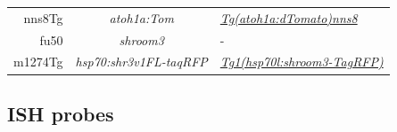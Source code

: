 \documentclass[11pt,singlespacinge,twoside]{reedthesis} %
\theoremstyle{definition}
\theoremstyle{definition}
\theoremstyle{definition}
\theoremstyle{remark}
\begin{document}
\begin{longtable}[]{@{}rcl@{}}
\begin{minipage}[t]{0.12\columnwidth}
nns8Tg\strut
\end{minipage} & \begin{minipage}[t]{0.29\columnwidth}\centering
\emph{atoh1a:Tom}\strut
\end{minipage} & \begin{minipage}[t]{0.50\columnwidth}\raggedright
\href{//zfin.org/ZDB-FISH-150901-21622}{\emph{Tg(atoh1a:dTomato)nns8}}\strut
\end{minipage}\tabularnewline
\begin{minipage}[t]{0.12\columnwidth}\raggedleft
fu50\strut
\end{minipage} & \begin{minipage}[t]{0.29\columnwidth}\centering
\emph{shroom3}\strut
\end{minipage} & \begin{minipage}[t]{0.50\columnwidth}\raggedright
-\strut
\end{minipage}\tabularnewline
\begin{minipage}[t]{0.12\columnwidth}\raggedleft
m1274Tg\strut
\end{minipage} & \begin{minipage}[t]{0.29\columnwidth}\centering
\emph{hsp70:shr3v1FL-taqRFP}\strut
\end{minipage} & \begin{minipage}[t]{0.50\columnwidth}\raggedright
\href{//zfin.org/ZDB-FISH-150901-25907}{\emph{Tg1(hsp70l:shroom3-TagRFP)}}\strut
\end{minipage}\tabularnewline
\bottomrule
\end{longtable}
\hypertarget{mat-probes}{%
\subsection{ISH probes}\label{mat-probes}}
\end{document}
